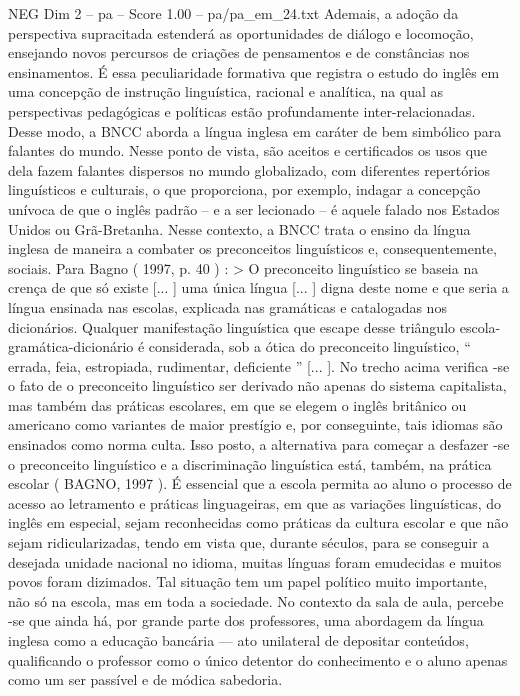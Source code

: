 \begin{textsample}{NEG Dim 2 – pa – Score 1.00 – pa/pa\_em\_24.txt}  \label{ex:f2_neg_229}
Ademais, a adoção da perspectiva supracitada estenderá as oportunidades de diálogo e locomoção, ensejando novos percursos de criações de pensamentos e de constâncias nos ensinamentos.
É essa peculiaridade formativa que registra o estudo do inglês em uma concepção de instrução linguística, racional e analítica, na qual as perspectivas pedagógicas e políticas estão profundamente inter-relacionadas.
Desse modo, a BNCC aborda a língua inglesa em caráter de bem simbólico para falantes do mundo.
Nesse ponto de vista, são aceitos e certificados os usos que dela fazem falantes dispersos no mundo globalizado, com diferentes repertórios linguísticos e culturais, o que proporciona, por exemplo, indagar a concepção unívoca de que o inglês padrão – e a ser lecionado – é aquele falado nos Estados Unidos ou Grã-Bretanha.
Nesse contexto, a BNCC trata o ensino da língua inglesa de maneira a combater os preconceitos linguísticos e, consequentemente, sociais.
Para Bagno ( 1997, p. 40 ) : > O preconceito linguístico se baseia na crença de que só existe [... ] uma única língua [... ] digna deste nome e que seria a língua ensinada nas escolas, explicada nas gramáticas e catalogadas nos dicionários.
Qualquer manifestação linguística que escape desse triângulo escola-gramática-dicionário é considerada, sob a ótica do preconceito linguístico, “ errada, feia, estropiada, rudimentar, deficiente ” [... ].
No trecho acima verifica -se o fato de o preconceito linguístico ser derivado não apenas do sistema capitalista, mas também das práticas escolares, em que se elegem o inglês britânico ou americano como variantes de maior prestígio e, por conseguinte, tais idiomas são ensinados como norma culta.
Isso posto, a alternativa para começar a desfazer -se o preconceito linguístico e a discriminação linguística está, também, na prática escolar ( BAGNO, 1997 ).
É essencial que a escola permita ao aluno o processo de acesso ao letramento e práticas linguageiras, em que as variações linguísticas, do inglês em especial, sejam reconhecidas como práticas da cultura escolar e que não sejam ridicularizadas, tendo em vista que, durante séculos, para se conseguir a desejada unidade nacional no idioma, muitas línguas foram emudecidas e muitos povos foram dizimados.
Tal situação tem um papel político muito importante, não só na escola, mas em toda a sociedade.
No contexto da sala de aula, percebe -se que ainda há, por grande parte dos professores, uma abordagem da língua inglesa como a educação bancária — ato unilateral de depositar conteúdos, qualificando o professor como o único detentor do conhecimento e o aluno apenas como um ser passível e de módica sabedoria.

\end{textsample}
